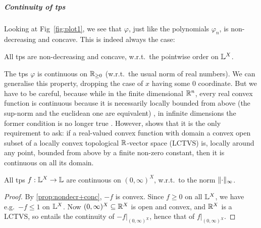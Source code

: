 \subparagraph*{Continuity of tps}\label{subsec:cont}%

Looking at Fig~\ref{fig:plot1}, we see that $\varphi$, just like the polynomials $\varphi_{n}$, is non-decreasing and concave.
This is indeed always the case:

\begin{proposition}\label{prop:nondecr+conc}
 All tps 
are non-decreasing and concave, w.r.t.\ the pointwise order on $\mathbb{L}^{X}$.
\end{proposition}


The tps $\varphi$ is continuous on $\mathbb{R}_{\geq0}$ (w.r.t.\ the usual norm of real numbers).
We can generalise this property, dropping the case of $x$ having some $0$ coordinate.
But we have to be careful, because while in the finite dimensional $\mathbb{R}^n$, every real convex function is continuous because it is necessarily locally bounded from above (the sup-norm and the euclidean one are equivalent) \cite[Proposition 4.7]{Cobzas2017}, in infinite dimensions the former condition is no longer true \cite[Example 4.8]{Cobzas2017}.
However, \cite[Proposition 4.4.(3)]{Cobzas2017} shows that it is the only requirement to ask: if a real-valued convex function with domain a convex open subset of a locally convex topological $\mathbb{R}$-vector space (LCTVS) is, locally around any point, bounded from above by a finite non-zero constant, then it is continuous on all its domain.

\begin{theorem}\label{thm:cont}
 All tps $f:\mathbb{L}^X\to\mathbb{L}$ are continuous on $(0,\infty)^X$, w.r.t.\ to the norm $\lVert\cdot\rVert_\infty$.
\end{theorem}
\begin{proof}
By \autoref{prop:nondecr+conc}, $-f$ is convex.
Since $f\geq 0$ on all $\mathbb{L}^X$, we have e.g.\ $-f\leq 1$ on $\mathbb{L}^X$.
Now $(0,\infty)^X\subseteq \mathbb{R}^X$ is open and convex, and {\color{red}$\mathbb{R}^X$ is a LCTVS}, so \cite[Proposition 4.4.(3)]{Cobzas2017} entails the continuity of $-f\big|_{(0,\infty)^X}$, hence that of $f\big|_{(0,\infty)^X}$.
\end{proof}

